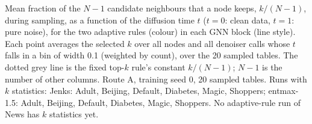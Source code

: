 Mean fraction of the $N-1$ candidate neighbours that a node keeps, $k/(N-1)$, during sampling, as a function of the diffusion time $t$ ($t=0$: clean data, $t=1$: pure noise), for the two adaptive rules (colour) in each GNN block (line style). Each point averages the selected $k$ over all nodes and all denoiser calls whose $t$ falls in a bin of width 0.1 (weighted by count), over the 20 sampled tables. The dotted grey line is the fixed top-$k$ rule's constant $k/(N-1)$; $N-1$ is the number of other columns. Route A, training seed 0, 20 sampled tables. Runs with $k$ statistics: Jenks: Adult, Beijing, Default, Diabetes, Magic, Shoppers; entmax-1.5: Adult, Beijing, Default, Diabetes, Magic, Shoppers. No adaptive-rule run of News has $k$ statistics yet.
